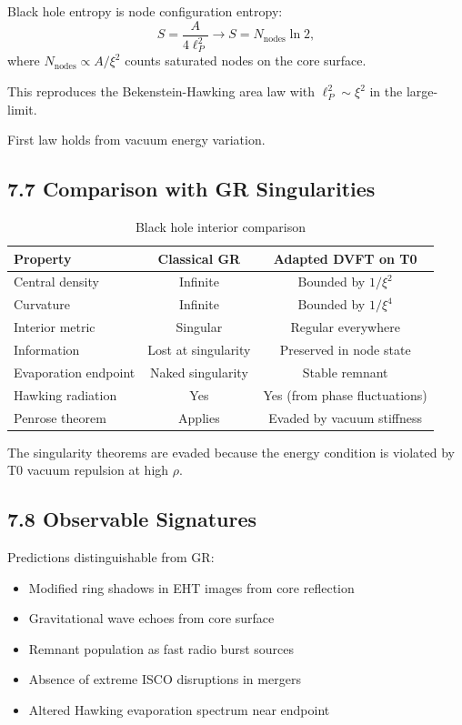 \documentclass[12pt,a4paper]{article}
\begin{document}
	Black hole entropy is node configuration entropy:
	\[
	S = \frac{A}{4 \ell_P^2} \to S = N_{\text{nodes}} \ln 2,
	\]
	where $N_{\text{nodes}} \propto A / \xi^2$ counts saturated nodes on the core surface.
	
	This reproduces the Bekenstein-Hawking area law with $\ell_P^2 \sim \xi^2$ in the large-limit.
	
	First law holds from vacuum energy variation.
	
	\subsection{7.7 Comparison with GR Singularities}
	
	\begin{table}[htbp]
		\centering
		\begin{tabular}{l|c|c}
			\hline
			Property & Classical GR & Adapted DVFT on T0 \\
			\hline
			Central density & Infinite & Bounded by $1/\xi^2$ \\
			Curvature & Infinite & Bounded by $1/\xi^4$ \\
			Interior metric & Singular & Regular everywhere \\
			Information & Lost at singularity & Preserved in node state \\
			Evaporation endpoint & Naked singularity & Stable remnant \\
			Hawking radiation & Yes & Yes (from phase fluctuations) \\
			Penrose theorem & Applies & Evaded by vacuum stiffness \\
			\hline
		\end{tabular}
		\caption{Black hole interior comparison}
		\label{tab:bh}
	\end{table}
	
	The singularity theorems are evaded because the energy condition is violated by T0 vacuum repulsion at high $\rho$.
	
	\subsection{7.8 Observable Signatures}
	
	Predictions distinguishable from GR:
	\begin{itemize}
		\item Modified ring shadows in EHT images from core reflection
		\item Gravitational wave echoes from core surface
		\item Remnant population as fast radio burst sources
		\item Absence of extreme ISCO disruptions in mergers
		\item Altered Hawking evaporation spectrum near endpoint
	\end{itemize}
	
\end{document}
